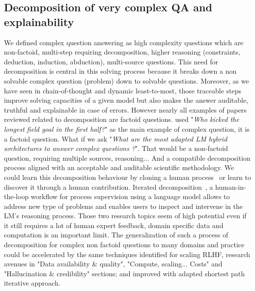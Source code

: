 \documentclass[acmsmall]{acmart}
\begin{document}
\subsection{Decomposition of very complex QA and explainability}
We defined complex question answering as high complexity questions which are non-factoid, multi-step requiring decomposition, higher reasoning (constraints, deduction, induction, abduction), multi-source questions. This need for decomposition is central in this solving process because it breaks down a non solvable complex question (problem) down to solvable questions. Moreover, as we have seen in chain-of-thought and dynamic least-to-most, those traceable steps improve solving capacities of a given model but also makes the answer auditable, truthful and explainable in case of errors. However nearly all examples of papers reviewed related to decomposition are factoid questions. \citet{duaSuccessivePromptingDecomposing2022}  used "\textit{Who kicked the longest field goal in the first half?}" as the main example of complex question, it is a factoid question. What if we ask "\textit{What are the most adapted LM hybrid architectures to answer complex questions ?}". That would be a non-factoid question, requiring multiple sources, reasoning... And a compatible decomposition process aligned with an acceptable and auditable scientific methodology. We could learn this decomposition behaviour by cloning a human process~\citep{yangChainThoughtImitation2022} or learn to discover it through a human contribution. Iterated decomposition~\citep{reppertIteratedDecompositionImproving2023}, a human-in-the-loop workflow for process supervision using a language model allows to address new type of problems and enables users to inspect and intervene in the LM’s reasoning process. Those two research topics seem of high potential even if it still requires a lot of human expert feedback, domain specific data and computation is an important limit. The generalization of such a process of decomposition for complex non factoid questions to many domains and practice could be accelerated by the same techniques identified for scaling RLHF, research avenues in "Data availability \& quality", "Compute, scaling... Costs" and "Hallucination \& credibility" sections; and improved with adapted shortest path iterative approach.
\end{document}
